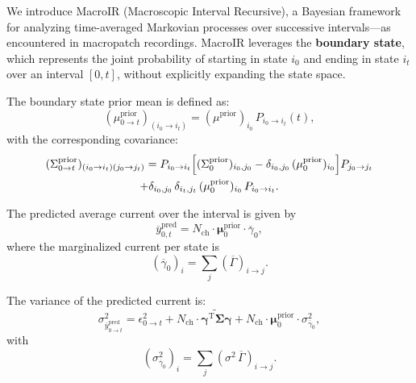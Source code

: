 \documentclass[pdflatex,sn-mathphys-num]{sn-jnl}%
\theoremstyle{thmstyleone}%
\theoremstyle{thmstyletwo}%
\theoremstyle{thmstylethree}%
\begin{document}
We introduce MacroIR (Macroscopic Interval Recursive), a Bayesian framework for analyzing time-averaged Markovian processes over successive intervals—as encountered in macropatch recordings. MacroIR leverages the \textbf{boundary state}, which represents the joint probability of starting in state \(i_0\) and ending in state \(i_t\) over an interval \([0,t]\), without explicitly expanding the state space.

The boundary state prior mean is defined as:
\begin{equation}
	(\mu^{\text{prior}}_{0 \rightarrow t})_{(i_0 \rightarrow i_t)} = (\mu^{\text{prior}})_{i_0} \, P_{i_0 \rightarrow i_t}(t),
	\label{eq:boundary_mean_prior}
\end{equation}
with the corresponding covariance:
\begin{multline}
	(\Sigma^{\text{prior}}_{0 \rightarrow t})_{(i_0 \rightarrow i_t)(j_0 \rightarrow j_t)} = P_{i_0 \rightarrow i_t}\Bigl[(\Sigma^{\text{prior}}_0)_{i_0,j_0} - \delta_{i_0,j_0}\, (\mu^{\text{prior}}_0)_{i_0}\Bigr] P_{j_0 \rightarrow j_t} \\
	+ \delta_{i_0,j_0}\,\delta_{i_t,j_t}\, (\mu^{\text{prior}}_0)_{i_0}\, P_{i_0 \rightarrow i_t}.
	\label{eq:boundary_covariance_prior}
\end{multline}

The predicted average current over the interval is given by
\begin{equation}
	\overline{y}^{\text{pred}}_{0,t} = N_{\text{ch}} \cdot \mathbf{\mu}^{\text{prior}}_{0} \cdot \overline{\gamma}_{0},
	\label{eq:macro_interval_predicted_y}
\end{equation}
where the marginalized current per state is
\begin{equation}
	(\overline{\gamma}_{0})_i = \sum_j (\overline{\Gamma})_{i \rightarrow j}.
\end{equation}

The variance of the predicted current is:
\begin{equation}
	\sigma^2_{\overline{y}^{\text{pred}}_{0 \rightarrow t}} = \epsilon^2_{0 \rightarrow t} + N_{\text{ch}} \cdot \widetilde{\mathbf{\gamma}^{\mathrm{T}} \mathbf{\Sigma}\mathbf{\gamma}} + N_{\text{ch}} \cdot \mathbf{\mu}^{\text{prior}}_{0} \cdot \sigma^2_{\overline{\gamma}_{0}},
	\label{eq:macro_interval_sigma_pred}
\end{equation}
with
\begin{equation}
	(\sigma^2_{\overline{\gamma}_{0}})_i = \sum_j (\sigma^2\,\overline{\Gamma})_{i \rightarrow j}.
\end{equation}
\end{document}

